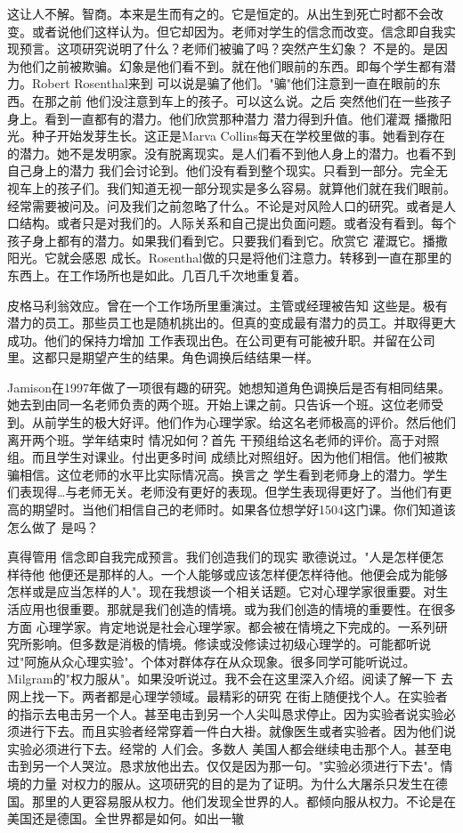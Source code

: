 这让人不解。智商。本来是生而有之的。它是恒定的。从出生到死亡时都不会改变。或者说他们这样认为。但它却因为。老师对学生的信念而改变。信念即自我实现预言。这项研究说明了什么？老师们被骗了吗？突然产生幻象？ 不是的。是因为他们之前被欺骗。幻象是他们看不到。就在他们眼前的东西。即每个学生都有潜力。Robert Rosenthal来到 可以说是骗了他们。"骗"他们注意到一直在眼前的东西。在那之前 他们没注意到车上的孩子。可以这么说。之后 突然他们在一些孩子身上。看到一直都有的潜力。他们欣赏那种潜力 潜力得到升值。他们灌溉 播撒阳光。种子开始发芽生长。这正是Marva Collins每天在学校里做的事。她看到存在的潜力。她不是发明家。没有脱离现实。是人们看不到他人身上的潜力。也看不到自己身上的潜力 我们会讨论到。他们没有看到整个现实。只看到一部分。完全无视车上的孩子们。我们知道无视一部分现实是多么容易。就算他们就在我们眼前。经常需要被问及。问及我们之前忽略了什么。不论是对风险人口的研究。或者是人口结构。或者只是对我们的。人际关系和自己提出负面问题。或者没有看到。每个孩子身上都有的潜力。如果我们看到它。只要我们看到它。欣赏它 灌溉它。播撒阳光。它就会感恩 成长。Rosenthal做的只是将他们注意力。转移到一直在那里的东西上。在工作场所也是如此。几百几千次地重复着。 

皮格马利翁效应。曾在一个工作场所里重演过。主管或经理被告知 这些是。极有潜力的员工。那些员工也是随机挑出的。但真的变成最有潜力的员工。并取得更大成功。他们的保持力增加 工作表现出色。在公司更有可能被升职。并留在公司里。这都只是期望产生的结果。角色调换后结结果一样。 

Jamison在1997年做了一项很有趣的研究。她想知道角色调换后是否有相同结果。她去到由同一名老师负责的两个班。开始上课之前。只告诉一个班。这位老师受到。从前学生的极大好评。他们作为心理学家。给这名老师极高的评价。然后他们离开两个班。学年结束时 情况如何？首先 干预组给这名老师的评价。高于对照组。而且学生对课业。付出更多时间 成绩比对照组好。因为他们相信。他们被欺骗相信。这位老师的水平比实际情况高。换言之 学生看到老师身上的潜力。学生们表现得…与老师无关。老师没有更好的表现。但学生表现得更好了。当他们有更高的期望时。当他们相信自己的老师时。如果各位想学好1504这门课。你们知道该怎么做了 是吗？ 

真得管用 信念即自我完成预言。我们创造我们的现实 歌德说过。"人是怎样便怎样待他 他便还是那样的人。一个人能够或应该怎样便怎样待他。他便会成为能够怎样或是应当怎样的人"。现在我想谈一个相关话题。它对心理学家很重要。对生活应用也很重要。那就是我们创造的情境。或为我们创造的情境的重要性。在很多方面 心理学家。肯定地说是社会心理学家。都会被在情境之下完成的。一系列研究所影响。但多数是消极的情境。修读或没修读过初级心理学的。可能都听说过"阿施从众心理实验"。个体对群体存在从众现象。很多同学可能听说过。Milgram的"权力服从"。如果没听说过。我不会在这里深入介绍。阅读了解一下 去网上找一下。两者都是心理学领域。最精彩的研究 在街上随便找个人。在实验者的指示去电击另一个人。甚至电击到另一个人尖叫恳求停止。因为实验者说实验必须进行下去。而且实验者经常穿着一件白大褂。就像医生或者实验者。因为他们说实验必须进行下去。经常的 人们会。多数人 美国人都会继续电击那个人。甚至电击到另一个人哭泣。恳求放他出去。仅仅是因为那一句。"实验必须进行下去"。情境的力量 对权力的服从。这项研究的目的是为了证明。为什么大屠杀只发生在德国。那里的人更容易服从权力。他们发现全世界的人。都倾向服从权力。不论是在美国还是德国。全世界都是如何。如出一辙 

